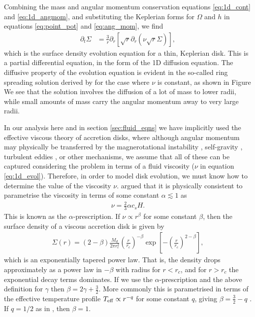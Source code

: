 Combining the mass and angular momentum conservation equations \ref{eq:1d_cont} and \ref{eq:1d_angmom}, and substituting the Keplerian forms for $\Omega$ and $h$ in equations \ref{eq:point_pot} and \ref{eq:ang_mom}, we find
\begin{align}
    \partial_t \Sigma &= \frac{3}{r} \partial_r \left[ \sqrt{r} \partial_r \left( \nu \sqrt{r} \Sigma  \right)  \right] \label{eq:1d_evol},
\end{align}
which is the surface density evolution equation for a thin, Keplerian disk. 
This is a partial differential equation, in the form of the 1D diffusion equation.
The diffusive property of the evolution equation is evident in the so-called ring spreading solution derived by \citet{lynden-bell1974} for the case where $\nu$ is constant, as shown in Figure %
We see that the solution involves the diffusion of a lot of mass to lower radii, while small amounts of mass carry the angular momentum away to very large radii.

In our analysis here and in section \ref{sec:fluid_eqns} we have implicitly used the effective viscous theory of accretion disks, where although angular momentum may physically be transferred by the magnerotational instability \citep{sano2000}, self-gravity \citep{kratter2016}, turbulent eddies \citep{klahr2003}, or other mechanisms, we assume that all of these can be captured considering the problem in terms of a fluid viscosity ($\nu$ in equation \ref{eq:1d_evol}).
Therefore, in order to model disk evolution, we must know how to determine the value of the viscosity $\nu$.
\citet{shakura1973} argued that it is physically consistent to parametrise the viscosity in terms of some constant $\alpha \lesssim 1$ as
\begin{align}
    \nu = \frac{2}{3} \alpha c_s H.
\end{align}
This is known as the $\alpha$-prescription. If $\nu \propto r^\beta$ for some constant $\beta$, then the surface density of a viscous accretion disk is given by \citep{lynden-bell1974}
\begin{align}
    \Sigma(r) = (2 - \beta) \frac{M_d}{2 \pi r_c^2} \left( \frac{r}{r_c} \right)^{-\beta} \exp{\left[ - \left(\frac{r}{r_c}\right)^{2-\beta} \right]},
\end{align}
which is an exponentially tapered power law. That is, the density drops approximately as a power law in $-\beta$ with radius for $r < r_c$, and for $r > r_c$ the exponential decay terms dominates. If we use the $\alpha$-prescription and the above definition for $\gamma$ then $\beta=2\gamma+\frac{3}{2}$. 
More commonly this is parametrised in terms of the effective temperature profile $T_{\rm eff} \propto r^{-q}$ for some constant $q$, giving $\beta = \frac{3}{2} - q$ \citep{hartmann1998}. 
If $q=1/2$ as in \citet{chiang1997}, then $\beta=1$.